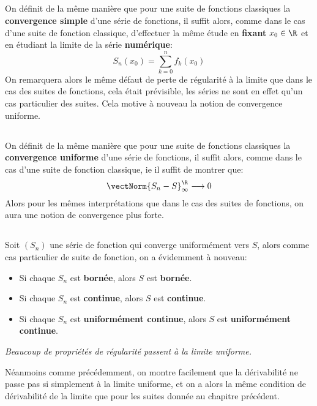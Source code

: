 \subsection*{}
On définit de la même manière que pour une suite de fonctions classiques la \textbf{convergence simple} d'une série de fonctions, il suffit alors, comme dans le cas d'une suite de fonction classique, d'effectuer la même étude en \textbf{fixant} \(x_0 \in \R\) et en étudiant la limite de la série \textbf{numérique}:
\[
   S_n(x_0) = \sum_{k=0}^{n} f_k(x_0)   
\]
On remarquera alors le même défaut de perte de régularité à la limite que dans le cas des suites de fonctions, cela était prévisible, les séries ne sont en effet qu'un cas particulier des suites. Cela motive à nouveau la notion de convergence uniforme.

\subsection*{}
On définit de la même manière que pour une suite de fonctions classiques la \textbf{convergence uniforme} d'une série de fonctions, il suffit alors, comme dans le cas d'une suite de fonction classique, ie il suffit de montrer que:
\[
   \vectNorm{S_n - S}_\infty^\R \longrightarrow 0
\]
Alors pour les mêmes interprétations que dans le cas des suites de fonctions, on aura une notion de convergence plus forte.

\subsection*{}
Soit \((S_n)\) une série de fonction qui converge uniformément vers \(S\), alors comme cas particulier de suite de fonction, on a évidemment à nouveau:
\begin{itemize}
   \item Si chaque \(S_n\) est \textbf{bornée}, alors \(S\) est \textbf{bornée}.
   \item Si chaque \(S_n\) est \textbf{continue}, alors \(S\) est \textbf{continue}.   
   \item Si chaque \(S_n\) est \textbf{uniformément continue}, alors \(S\) est \textbf{uniformément continue}.
\end{itemize}
\begin{center}
   \textit{Beaucoup de propriétés de régularité passent à la limite uniforme.}
\end{center}
Néanmoins comme précédemment, on montre facilement que la dérivabilité ne passe pas si simplement à la limite uniforme, et on a alors la même condition de dérivabilité de la limite que pour les suites donnée au chapitre précédent.\<

